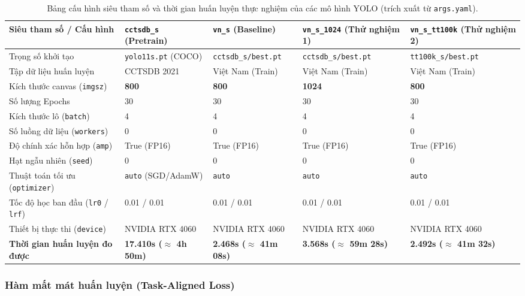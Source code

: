 \begin{table}[H]
\centering
\small
\caption{Bảng cấu hình siêu tham số và thời gian huấn luyện thực nghiệm của các mô hình YOLO (trích xuất từ \texttt{args.yaml}).}
\label{tab:yolo_training_configs}
\begin{tabularx}{\textwidth}{|p{3.8cm}|p{2.8cm}|p{2.8cm}|p{2.8cm}|Y|}
\hline
\textbf{Siêu tham số / Cấu hình} & \textbf{\texttt{cctsdb\_s} (Pretrain)} & \textbf{\texttt{vn\_s} (Baseline)} & \textbf{\texttt{vn\_s\_1024} (Thử nghiệm 1)} & \textbf{\texttt{vn\_s\_tt100k} (Thử nghiệm 2)} \\
\hline
Trọng số khởi tạo & \texttt{yolo11s.pt} (COCO) & \texttt{cctsdb\_s/best.pt} & \texttt{cctsdb\_s/best.pt} & \texttt{tt100k\_s/best.pt} \\
\hline
Tập dữ liệu huấn luyện & CCTSDB 2021 & Việt Nam (Train) & Việt Nam (Train) & Việt Nam (Train) \\
\hline
Kích thước canvas (\texttt{imgsz}) & \textbf{800} & \textbf{800} & \textbf{1024} & \textbf{800} \\
\hline
Số lượng Epochs & 30 & 30 & 30 & 30 \\
\hline
Kích thước lô (\texttt{batch}) & 4 & 4 & 4 & 4 \\
\hline
Số luồng dữ liệu (\texttt{workers}) & 0 & 0 & 0 & 0 \\
\hline
Độ chính xác hỗn hợp (\texttt{amp}) & True (FP16) & True (FP16) & True (FP16) & True (FP16) \\
\hline
Hạt ngẫu nhiên (\texttt{seed}) & 0 & 0 & 0 & 0 \\
\hline
Thuật toán tối ưu (\texttt{optimizer}) & \texttt{auto} (SGD/AdamW) & \texttt{auto} & \texttt{auto} & \texttt{auto} \\
\hline
Tốc độ học ban đầu (\texttt{lr0} / \texttt{lrf}) & 0.01 / 0.01 & 0.01 / 0.01 & 0.01 / 0.01 & 0.01 / 0.01 \\
\hline
Thiết bị thực thi (\texttt{device}) & NVIDIA RTX 4060 & NVIDIA RTX 4060 & NVIDIA RTX 4060 & NVIDIA RTX 4060 \\
\hline
\textbf{Thời gian huấn luyện đo được} & \textbf{17.410s ($\approx$ 4h 50m)} & \textbf{2.468s ($\approx$ 41m 08s)} & \textbf{3.568s ($\approx$ 59m 28s)} & \textbf{2.492s ($\approx$ 41m 32s)} \\
\hline
\end{tabularx}
\end{table}

\subsubsection{Hàm mất mát huấn luyện (Task-Aligned Loss)}
\label{subsubsec:yolo_loss_formula}

